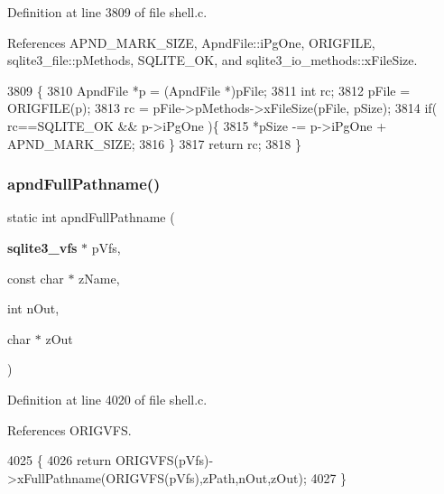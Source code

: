 Definition at line 3809 of file shell.\+c.



References A\+P\+N\+D\+\_\+\+M\+A\+R\+K\+\_\+\+S\+I\+ZE, Apnd\+File\+::i\+Pg\+One, O\+R\+I\+G\+F\+I\+LE, sqlite3\+\_\+file\+::p\+Methods, S\+Q\+L\+I\+T\+E\+\_\+\+OK, and sqlite3\+\_\+io\+\_\+methods\+::x\+File\+Size.


\begin{DoxyCode}
3809                                                                  \{
3810   ApndFile *p = (ApndFile *)pFile;
3811   \textcolor{keywordtype}{int} rc;
3812   pFile = ORIGFILE(p);
3813   rc = pFile->pMethods->xFileSize(pFile, pSize);
3814   \textcolor{keywordflow}{if}( rc==SQLITE_OK && p->iPgOne )\{
3815     *pSize -= p->iPgOne + APND_MARK_SIZE;
3816   \}
3817   \textcolor{keywordflow}{return} rc;
3818 \}
\end{DoxyCode}
\mbox{\label{shell_8c_a25e29f113ecdf7dc4b15b6a7f7517c6e}} 
\subsubsection{apnd\+Full\+Pathname()}
{\footnotesize\ttfamily static int apnd\+Full\+Pathname (\begin{DoxyParamCaption}\item[{\textbf{ sqlite3\+\_\+vfs} $\ast$}]{p\+Vfs,  }\item[{const char $\ast$}]{z\+Name,  }\item[{int}]{n\+Out,  }\item[{char $\ast$}]{z\+Out }\end{DoxyParamCaption})\hspace{0.3cm}{\ttfamily [static]}}



Definition at line 4020 of file shell.\+c.



References O\+R\+I\+G\+V\+FS.


\begin{DoxyCode}
4025  \{
4026   \textcolor{keywordflow}{return} ORIGVFS(pVfs)->xFullPathname(ORIGVFS(pVfs),zPath,nOut,zOut);
4027 \}
\end{DoxyCode}
\mbox{\label{shell_8c_ab3bf715e5cb2bb85d29669605aac6b81}} 
